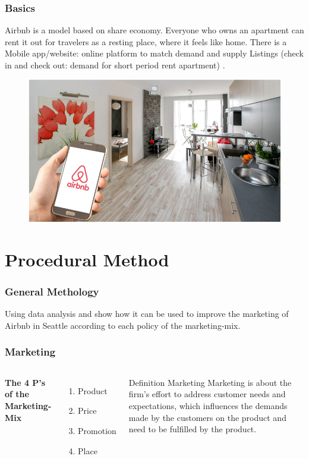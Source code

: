 \documentclass{beamer}
\begin{document}
\begin{frame}
\frametitle{Basics}
Airbnb is a model based on share economy. Everyone who owns an apartment can rent it out for travelers as a resting place, where it feels like home. There is a Mobile app/website: online platform to match demand and supply Listings (check in and check out: demand for short period rent apartment) .
\begin{figure}
\includegraphics[width=0.4\linewidth]{photo/basics1}
\end{figure}
\end{frame}

\section{Procedural Method}
\begin{frame}
\frametitle{General Methology}
Using data analysis and show how it can be used to improve the marketing of Airbnb in Seattle according to each policy of the marketing-mix.
\end{frame}
%
%
\begin{frame}
\frametitle{Marketing}
\begin{columns}[c] %

\textbf{The 4 P's of the Marketing-Mix}
\begin{enumerate}
\item Product
\item Price
\item Promotion
\item Place
\end{enumerate}


\begin{block}{Definition Marketing}
Marketing is about the firm’s effort to address customer needs and expectations, which influences the demands made by the customers on the product and need to be fulfilled by the product.
\end{block}
\end{columns}
\end{frame}
\end{document}
